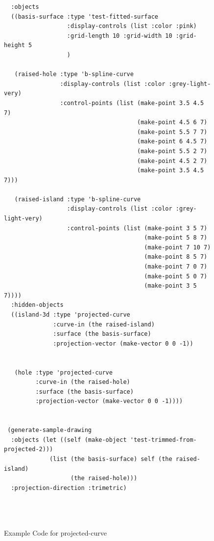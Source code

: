 \documentclass [11pt]{book}
\begin{document}
\begin{itemize}
\begin{figure}
\begin{lrbox}{\boxedverb}
\begin{minipage}{\linewidth}
{\begin{verbatim}
  :objects
  ((basis-surface :type 'test-fitted-surface
                  :display-controls (list :color :pink)
                  :grid-length 10 :grid-width 10 :grid-height 5
                  )
   
   (raised-hole :type 'b-spline-curve
                :display-controls (list :color :grey-light-very)
                :control-points (list (make-point 3.5 4.5 7)
                                      (make-point 4.5 6 7) 
                                      (make-point 5.5 7 7) 
                                      (make-point 6 4.5 7) 
                                      (make-point 5.5 2 7) 
                                      (make-point 4.5 2 7) 
                                      (make-point 3.5 4.5 7)))

   (raised-island :type 'b-spline-curve
                  :display-controls (list :color :grey-light-very)
                  :control-points (list (make-point 3 5 7)
                                        (make-point 5 8 7) 
                                        (make-point 7 10 7) 
                                        (make-point 8 5 7) 
                                        (make-point 7 0 7) 
                                        (make-point 5 0 7) 
                                        (make-point 3 5 7))))
  :hidden-objects
  ((island-3d :type 'projected-curve
              :curve-in (the raised-island)
              :surface (the basis-surface)
              :projection-vector (make-vector 0 0 -1))
   

   (hole :type 'projected-curve
         :curve-in (the raised-hole)
         :surface (the basis-surface)
         :projection-vector (make-vector 0 0 -1))))


 (generate-sample-drawing 
  :objects (let ((self (make-object 'test-trimmed-from-projected-2)))
             (list (the basis-surface) self (the raised-island) 
                   (the raised-hole)))
  :projection-direction :trimetric)
 

 
\end{verbatim}}
\end{minipage}
\end{lrbox}
\fbox{\usebox{\boxedverb}}

\caption{Example Code for projected-curve}

\label{fig:example-code-projected-curve}

\end{figure}


\end{itemize}
\end{document}
